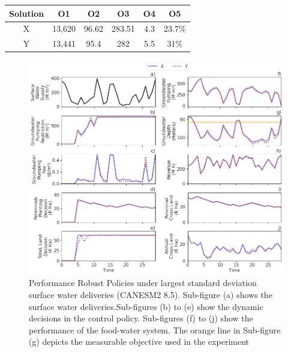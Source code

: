\documentclass[11pt,a4paper]{article}
\begin{document}
\begin{center}
\begin{tabular}{ |c|c|c|c|c|c| }
 \hline
 Solution & O1 & O2 & O3 & O4 & O5 \\ 
 \hline
X &  13,620  & 96.62 & 283.51 & 4.3 & 23.7\% \\
Y & 13,441 & 95.4 & 282 & 5.5 & 31\% \\
\hline
\end{tabular}
\end{center}


\begin{figure}[H]
    \centering
    \includegraphics[width=1\textwidth]{selected_robust_performance_s1.png}
    \caption{Performance Robust Policies under largest standard deviation surface water deliveries (CANESM2 8.5). Sub-figure (a) shows the surface water deliveries.Sub-figures (b) to (e) show the dynamic decisions in the control policy. Sub-figures (f) to (j) show the performance of the food-water system. The orange line in Sub-figure (g) depicts the measurable objective used in the experiment}
    \label{fig:m1esh1}
\end{figure}
\end{document}
